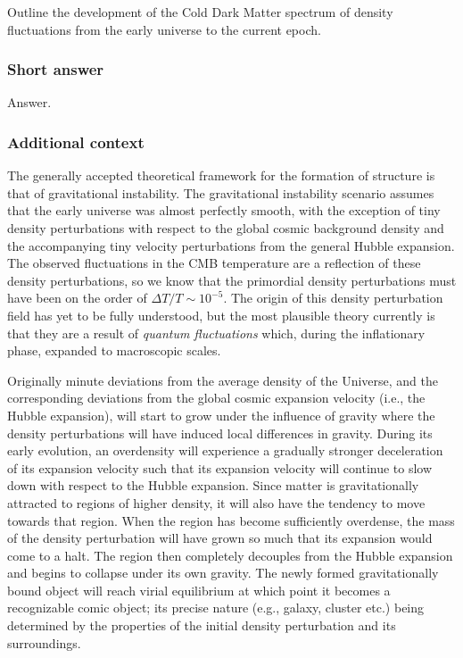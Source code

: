 \documentclass[a4paper,11pt]{article}
\begin{document}
Outline the development of the Cold Dark Matter spectrum of density fluctuations from the early universe to the current epoch.

\subsubsection{Short answer}

Answer.

\subsubsection{Additional context}

The generally accepted theoretical framework for the formation of structure is that of gravitational instability. The gravitational instability scenario assumes that the early universe was almost perfectly smooth, with the exception of tiny density perturbations with respect to the global cosmic background density and the accompanying tiny velocity perturbations from the general Hubble expansion. The observed fluctuations in the CMB temperature are a reflection of these density perturbations, so we know that the primordial density perturbations must have been on the order of $\Delta T / T \sim 10^{-5}$. The origin of this density perturbation field has yet to be fully understood, but the most plausible theory currently is that they are a result of \textit{quantum fluctuations} which, during the inflationary phase, expanded to macroscopic scales.

{\noindent}Originally minute deviations from the average density of the Universe, and the corresponding deviations from the global cosmic expansion velocity (i.e., the Hubble expansion), will start to grow under the influence of gravity where the density perturbations will have induced local differences in gravity. During its early evolution, an overdensity will experience a gradually stronger deceleration of its expansion velocity such that its expansion velocity will continue to slow down with respect to the Hubble expansion. Since matter is gravitationally attracted to regions of higher density, it will also have the tendency to move towards that region. When the region has become sufficiently overdense, the mass of the density perturbation will have grown so much that its expansion would come to a halt. The region then completely decouples from the Hubble expansion and begins to collapse under its own gravity. The newly formed gravitationally bound object will reach virial equilibrium at which point it becomes a recognizable comic object; its precise nature (e.g., galaxy, cluster etc.) being determined by the properties of the initial density perturbation and its surroundings.
\end{document}
